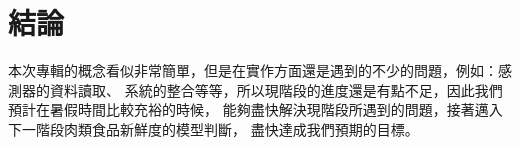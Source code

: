\chapter{結論}

本次專輯的概念看似非常簡單，但是在實作方面還是遇到的不少的問題，例如：感測器的資料讀取、
系統的整合等等，所以現階段的進度還是有點不足，因此我們預計在暑假時間比較充裕的時候，
能夠盡快解決現階段所遇到的問題，接著邁入下一階段肉類食品新鮮度的模型判斷，
盡快達成我們預期的目標。